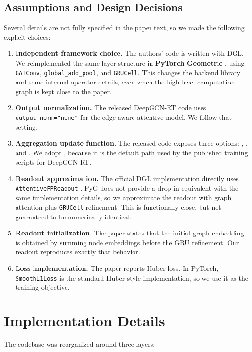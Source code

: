 \subsection{Assumptions and Design Decisions}

Several details are not fully specified in the paper text, so we made the following explicit choices:

\begin{enumerate}
    \item \textbf{Independent framework choice.} The authors' code is written with DGL. We reimplemented the same layer structure in \textbf{PyTorch Geometric} \cite{fey2019}, using \texttt{GATConv}, \texttt{global\_add\_pool}, and \texttt{GRUCell}. This changes the backend library and some internal operator details, even when the high-level computation graph is kept close to the paper.
    \item \textbf{Output normalization.} The released DeepGCN-RT code uses \texttt{output\_norm="none"} for the edge-aware attentive model. We follow that setting.
    \item \textbf{Aggregation update function.} The released code exposes three options: , , and . We adopt , because it is the default path used by the published training scripts for DeepGCN-RT.
    \item \textbf{Readout approximation.} The official DGL implementation directly uses \texttt{AttentiveFPReadout} \cite{xiong2019}. PyG does not provide a drop-in equivalent with the same implementation details, so we approximate the readout with graph attention plus \texttt{GRUCell} refinement. This is functionally close, but not guaranteed to be numerically identical.
    \item \textbf{Readout initialization.} The paper states that the initial graph embedding is obtained by summing node embeddings before the GRU refinement. Our readout reproduces exactly that behavior.
    \item \textbf{Loss implementation.} The paper reports Huber loss. In PyTorch, \texttt{SmoothL1Loss} is the standard Huber-style implementation, so we use it as the training objective.
\end{enumerate}

\section{Implementation Details}

The codebase was reorganized around three layers:

